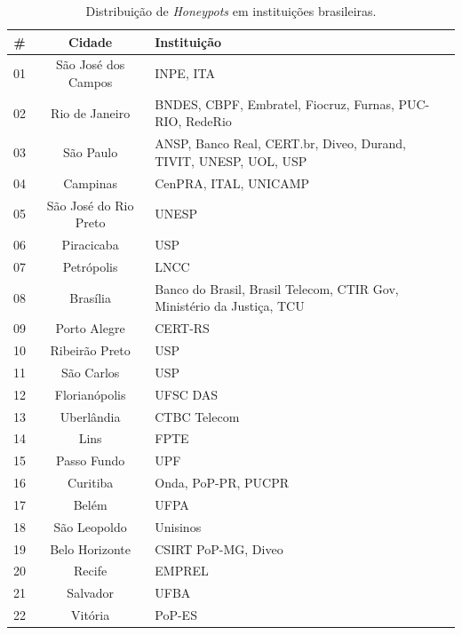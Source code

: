 \begin{table}[H]
    \caption{\label{tabela:instituicoes_honeypots}Distribuição de \textit{Honeypots} em instituições brasileiras.}
    \begin{center}
        \begin{tabular}{c|c|p{8cm}}
            \hline
            \hline
                \textbf{\#} & \textbf{Cidade} & \textbf{Instituição}\\
            \hline
                01 & São José dos Campos & INPE, ITA\\
            \hline
                02 & Rio de Janeiro & BNDES, CBPF, Embratel, Fiocruz, Furnas, PUC-RIO, RedeRio\\
            \hline
                03 & São Paulo & ANSP, Banco Real, CERT.br, Diveo, Durand, TIVIT, UNESP, UOL, USP\\
            \hline
                04 & Campinas & CenPRA, ITAL, UNICAMP\\
            \hline
                05 & São José do Rio Preto & UNESP\\
            \hline
                06 & Piracicaba & USP\\
            \hline
                07 & Petrópolis & LNCC\\
            \hline
                08 & Brasília & Banco do Brasil, Brasil Telecom, CTIR Gov, Ministério da Justiça, TCU\\
            \hline
                09 & Porto Alegre & CERT-RS\\
            \hline
                10 & Ribeirão Preto & USP\\
            \hline
                11 & São Carlos & USP\\
            \hline
                12 & Florianópolis & UFSC DAS\\
            \hline
                13 & Uberlândia & CTBC Telecom\\
            \hline
                14 & Lins & FPTE\\
            \hline
                15 & Passo Fundo & UPF\\
            \hline
                16 & Curitiba & Onda, PoP-PR, PUCPR\\
            \hline
                17 & Belém & UFPA\\
            \hline
                18 & São Leopoldo & Unisinos\\
            \hline
                19 & Belo Horizonte & CSIRT PoP-MG, Diveo\\
            \hline
                20 & Recife & EMPREL\\
            \hline
                21 & Salvador & UFBA\\
            \hline
                22 & Vitória & PoP-ES \\
            \hline
            \hline
        \end{tabular}
    \end{center}
\end{table}



